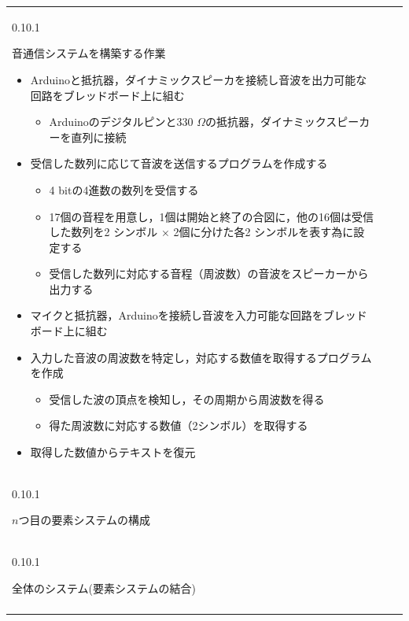 \documentclass[a4j,11pt,dvipdfmx]{jsarticle}
\makeatletter
\renewcommand{\subsection}{%
    \@startsection{subsection}{1}{\z@}%
    {0.1\Cvs}{0.1\Cvs}%
    {\normalfont\headfont\raggedright}}
\newcommand{\bhline}{\noalign{\hrule height 1pt}}
\makeatother
\begin{document}
\begin{table}[H]
\begin{tabular}{bp{}b}
\subsection{音通信システムを構築する作業}
\begin{itemize}
  \item Arduinoと抵抗器，ダイナミックスピーカを接続し音波を出力可能な回路をブレッドボード上に組む
    \begin{itemize}
      \item Arduinoのデジタルピンと330 $\Omega$の抵抗器，ダイナミックスピーカーを直列に接続
    \end{itemize}
  \item 受信した数列に応じて音波を送信するプログラムを作成する
    \begin{itemize}
      \item 4 bitの4進数の数列を受信する
      \item 17個の音程を用意し，1個は開始と終了の合図に，他の16個は受信した数列を2 シンボル $\times$ 2個に分けた各2 シンボルを表す為に設定する
      \item 受信した数列に対応する音程（周波数）の音波をスピーカーから出力する
    \end{itemize}
  \item マイクと抵抗器，Arduinoを接続し音波を入力可能な回路をブレッドボード上に組む
  \item 入力した音波の周波数を特定し，対応する数値を取得するプログラムを作成
    \begin{itemize}
      \item 受信した波の頂点を検知し，その周期から周波数を得る
      \item 得た周波数に対応する数値（2シンボル）を取得する
    \end{itemize}
  \item 取得した数値からテキストを復元
\end{itemize}

	 \\ \bhline
\subsection{$n$つ目の要素システムの構成}

	 \\ \bhline
\subsection{全体のシステム(要素システムの結合)}
	
	\\ \bhline
\end{tabular}
\end{table}
\end{document}
